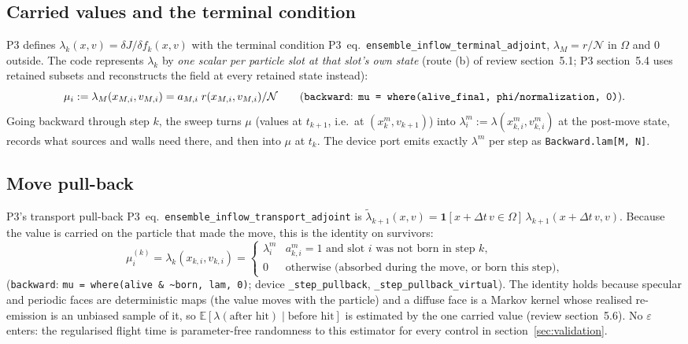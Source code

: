 \documentclass[11pt,a4paper]{article}
\numberwithin{equation}{section}
\newcommand{\E}{\mathbb{E}}
\newcommand{\ind}{\mathbf{1}}
\newcommand{\code}[1]{\texttt{#1}}
\newcommand{\Nn}{\mathcal{N}}
\newcommand{\pref}[1]{P3~eq.~\code{#1}}
\begin{document}
\subsection{Carried values and the terminal condition}

P3 defines $\lambda_k(x,v) = \delta J/\delta f_k(x,v)$ with the terminal condition
\pref{ensemble\_inflow\_terminal\_adjoint}, $\lambda_M = r/\Nn$ in $\Omega$ and $0$
outside.  The code represents $\lambda_k$ by \emph{one scalar per particle slot at
that slot's own state} (route (b) of review section~5.1; P3 section~5.4 uses retained
subsets and reconstructs the field at every retained state instead):
\begin{equation}
\label{eq:terminal}
\mu_i := \lambda_{M}(x_{M,i}, v_{M,i}) = a_{M,i}\; r(x_{M,i}, v_{M,i})/\Nn
\qquad
\text{(\code{backward}: \code{mu = where(alive\_final, phi/normalization, 0)})}.
\end{equation}
Going backward through step $k$, the sweep turns $\mu$ (values at $t_{k+1}$, i.e.\ at
$(x^m_k, v_{k+1})$) into $\lambda^m_i := \lambda(x^m_{k,i}, v^m_{k,i})$ at the post-move
state, records what sources and walls need there, and then into $\mu$ at $t_k$.
The device port emits exactly $\lambda^m$ per step as \code{Backward.lam[M, N]}.

\subsection{Move pull-back}
\label{sec:move}

P3's transport pull-back \pref{ensemble\_inflow\_transport\_adjoint} is
$\tilde\lambda_{k+1}(x,v) = \ind[x + \Delta t\, v \in \Omega]\,\lambda_{k+1}(x + \Delta t\, v, v)$.
Because the value is carried on the particle that made the move, this is the
identity on survivors:
\begin{equation}
\label{eq:move-pullback}
\mu_i^{(k)} = \lambda_k(x_{k,i}, v_{k,i}) =
\begin{cases}
\lambda^m_i & a^m_{k,i} = 1 \text{ and slot } i \text{ was not born in step } k,\\
0 & \text{otherwise (absorbed during the move, or born this step)},
\end{cases}
\end{equation}
(\code{backward}: \code{mu = where(alive \& \textasciitilde born, lam, 0)};
device \code{\_step\_pullback}, \code{\_step\_pullback\_virtual}).
The identity holds because specular and periodic faces are deterministic maps
(the value moves with the particle) and a diffuse face is a Markov kernel whose
realised re-emission is an unbiased sample of it, so
$\E[\lambda(\text{after hit})\mid \text{before hit}]$ is estimated by the one carried
value (review section~5.6).  No $\varepsilon$ enters: the regularised flight time is
parameter-free randomness to this estimator for every control in
section~\ref{sec:validation}.
\end{document}
